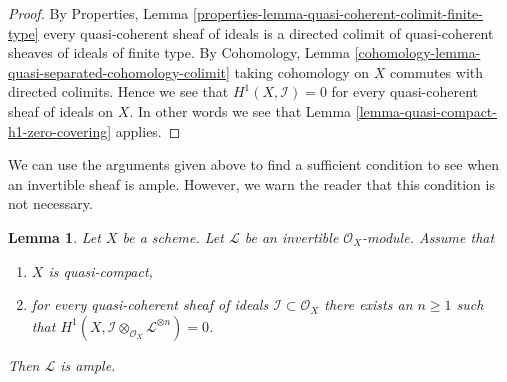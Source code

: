 \documentclass{stacks-project}
\theoremstyle{plain}
\newtheorem{lemma}[subsection]{Lemma}
\theoremstyle{definition}
\theoremstyle{remark}
\numberwithin{equation}{subsection}
\begin{document}
\begin{proof}
By
Properties, Lemma \ref{properties-lemma-quasi-coherent-colimit-finite-type}
every quasi-coherent sheaf of ideals is a directed colimit of
quasi-coherent sheaves of ideals of finite type.
By Cohomology, Lemma \ref{cohomology-lemma-quasi-separated-cohomology-colimit}
taking cohomology on $X$ commutes with directed colimits.
Hence we see that $H^1(X, \mathcal{I}) = 0$
for every quasi-coherent sheaf of ideals on $X$. In other words
we see that Lemma \ref{lemma-quasi-compact-h1-zero-covering} applies.
\end{proof}

\noindent
We can use the arguments given above to find a sufficient condition to
see when an invertible sheaf is ample. However, we warn the reader that
this condition is not necessary.

\begin{lemma}
\label{lemma-quasi-compact-h1-zero-invertible}
Let $X$ be a scheme. Let $\mathcal{L}$ be an invertible $\mathcal{O}_X$-module.
Assume that
\begin{enumerate}
\item $X$ is quasi-compact,
\item for every quasi-coherent sheaf of ideals
$\mathcal{I} \subset \mathcal{O}_X$
there exists an $n \geq 1$ such that
$H^1(X, \mathcal{I} \otimes_{\mathcal{O}_X} \mathcal{L}^{\otimes n}) = 0$.
\end{enumerate}
Then $\mathcal{L}$ is ample.
\end{lemma}
\end{document}
